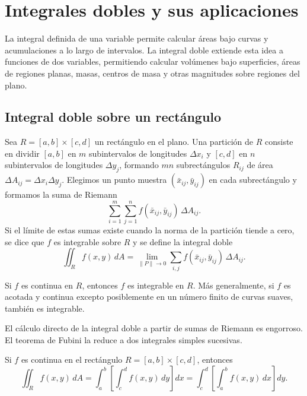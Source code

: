 \chapter{Integrales dobles y sus aplicaciones}


La integral definida de una variable permite calcular áreas bajo curvas y acumulaciones a lo largo de intervalos. La integral doble extiende esta idea a funciones de dos variables, permitiendo calcular volúmenes bajo superficies, áreas de regiones planas, masas, centros de masa y otras magnitudes sobre regiones del plano.

\section{Integral doble sobre un rectángulo}

Sea $R=[a,b]\times[c,d]$ un rectángulo en el plano. Una partición de $R$ consiste en dividir $[a,b]$ en $m$ subintervalos de longitudes $\Delta x_i$ y $[c,d]$ en $n$ subintervalos de longitudes $\Delta y_j$, formando $mn$ subrectángulos $R_{ij}$ de área $\Delta A_{ij}=\Delta x_i\Delta y_j$. Elegimos un punto muestra $(\bar{x}_{ij},\bar{y}_{ij})$ en cada subrectángulo y formamos la suma de Riemann
\[
\sum_{i=1}^m\sum_{j=1}^n f(\bar{x}_{ij},\bar{y}_{ij})\,\Delta A_{ij}.
\]
Si el límite de estas sumas existe cuando la norma de la partición tiende a cero, se dice que $f$ es integrable sobre $R$ y se define la integral doble
\[
\iint_R f(x,y)\,dA = \lim_{\|P\|\to0}\sum_{i,j} f(\bar{x}_{ij},\bar{y}_{ij})\,\Delta A_{ij}.
\]

\begin{theorem}[Integrabilidad]
Si $f$ es continua en $R$, entonces $f$ es integrable en $R$. Más generalmente, si $f$ es acotada y continua excepto posiblemente en un número finito de curvas suaves, también es integrable.
\end{theorem}

El cálculo directo de la integral doble a partir de sumas de Riemann es engorroso. El teorema de Fubini la reduce a dos integrales simples sucesivas.

\begin{theorem}[Fubini]
Si $f$ es continua en el rectángulo $R=[a,b]\times[c,d]$, entonces
\[
\iint_R f(x,y)\,dA = \int_a^b\left[\int_c^d f(x,y)\,dy\right]dx
= \int_c^d\left[\int_a^b f(x,y)\,dx\right]dy.
\]
\end{theorem}

